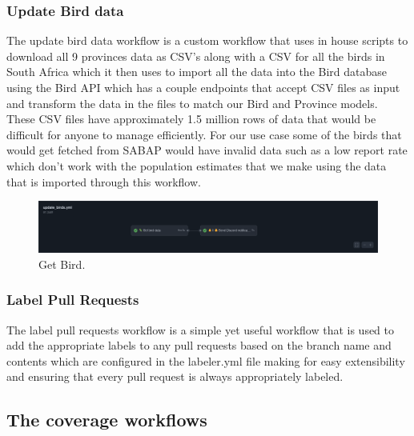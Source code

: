 \documentclass[a4paper]{article}
\begin{document}
\subsubsection{Update Bird data}

The update bird data workflow is a custom workflow that uses in house scripts to download 
all 9 provinces data as CSV's along with a CSV for all the birds in South Africa which it 
then uses to import all the data into the Bird database using the Bird API which 
has a couple endpoints that accept CSV files as input and transform the data in the files to match
our Bird and Province models. These CSV files have approximately 1.5 million rows of data 
that would be difficult for anyone to manage efficiently. For our use case some of the 
birds that would get fetched from SABAP would have invalid data such as a low report rate 
which don't work with the population estimates that we make using the data that is imported 
through this workflow. 

\begin{figure}[h]
  \includegraphics[width=\linewidth]{../Assets/get_bird.png}
  \caption{Get Bird.}
  \label{fig:load graphs}
\end{figure}

\subsubsection{Label Pull Requests}

The label pull requests workflow is a simple yet useful workflow that is used to add the appropriate
labels to any pull requests based on the branch name and contents which are configured 
in the labeler.yml file making for easy extensibility and ensuring that every pull
request is always appropriately labeled. 

\subsection{The coverage workflows}
\end{document}
